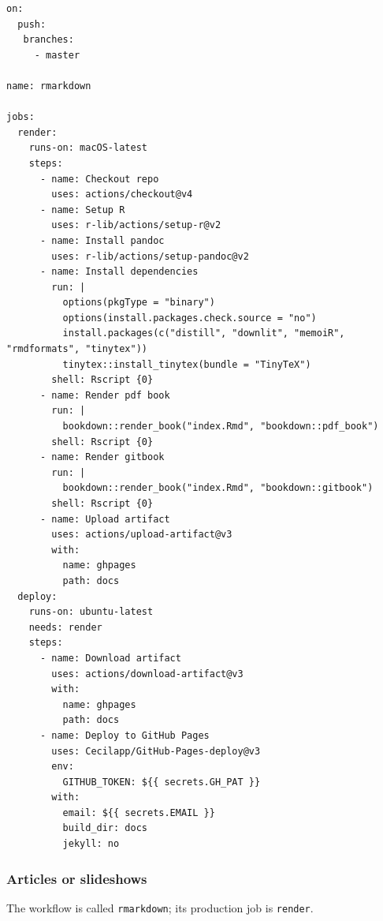 \documentclass[
  12pt,
  american,
  a4paper,
  extrafontsizes,onecolumn,openright
  ]{memoir}
\begin{document}
\begin{verbatim}
on:
  push:
   branches:
     - master

name: rmarkdown

jobs:
  render:
    runs-on: macOS-latest
    steps:
      - name: Checkout repo
        uses: actions/checkout@v4
      - name: Setup R
        uses: r-lib/actions/setup-r@v2
      - name: Install pandoc
        uses: r-lib/actions/setup-pandoc@v2
      - name: Install dependencies
        run: |
          options(pkgType = "binary")
          options(install.packages.check.source = "no")
          install.packages(c("distill", "downlit", "memoiR", "rmdformats", "tinytex"))
          tinytex::install_tinytex(bundle = "TinyTeX")
        shell: Rscript {0}
      - name: Render pdf book
        run: |
          bookdown::render_book("index.Rmd", "bookdown::pdf_book")
        shell: Rscript {0}
      - name: Render gitbook
        run: |
          bookdown::render_book("index.Rmd", "bookdown::gitbook")
        shell: Rscript {0}
      - name: Upload artifact
        uses: actions/upload-artifact@v3
        with:
          name: ghpages
          path: docs
  deploy:
    runs-on: ubuntu-latest
    needs: render
    steps:
      - name: Download artifact
        uses: actions/download-artifact@v3
        with:
          name: ghpages
          path: docs
      - name: Deploy to GitHub Pages
        uses: Cecilapp/GitHub-Pages-deploy@v3
        env:
          GITHUB_TOKEN: ${{ secrets.GH_PAT }}
        with:
          email: ${{ secrets.EMAIL }}
          build_dir: docs
          jekyll: no
\end{verbatim}

\subsubsection{Articles or slideshows}\label{articles-or-slideshows}

The workflow is called \texttt{rmarkdown}; its production job is \texttt{render}.
\end{document}

